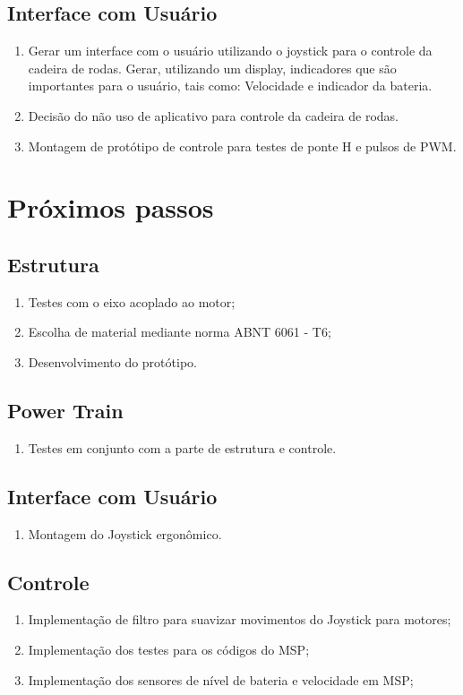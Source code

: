   \subsection{Interface com Usuário}
    \begin{enumerate}
      \item Gerar um interface com o usuário utilizando o joystick para o controle da cadeira de rodas. Gerar, utilizando um display, indicadores que são importantes para o usuário, tais como: Velocidade e indicador da bateria.
      \item Decisão do não uso de aplicativo para controle da cadeira de rodas.
      \item Montagem de protótipo de controle para testes de ponte H e pulsos de PWM.
    \end{enumerate}

\section{Próximos passos}
  \subsection{Estrutura}
    \begin{enumerate}
      \item Testes com o eixo acoplado ao motor;
      \item Escolha de material mediante norma ABNT 6061 - T6;
	 \item Desenvolvimento do protótipo.
    \end{enumerate}
  \subsection{Power Train}
    \begin{enumerate}
      \item Testes em conjunto com a parte de estrutura e controle.
      \end{enumerate}

  \subsection{Interface com Usuário}
    \begin{enumerate}
      \item Montagem do Joystick ergonômico.
    \end{enumerate}
  \subsection{Controle}
    \begin{enumerate}
     \item Implementação de filtro para suavizar movimentos do Joystick para motores;
     \item Implementação dos testes para os códigos do MSP;
     \item Implementação dos sensores de nível de bateria e velocidade em MSP;
    \end{enumerate}
